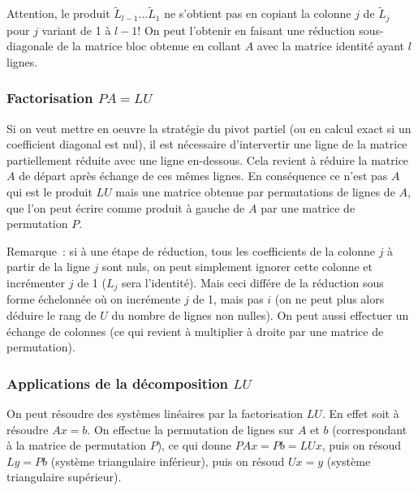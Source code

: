 \documentclass[a4paper,11pt]{article}
\begin{document}
Attention, le produit $\tilde{L}_{l-1}...\tilde{L}_1$ ne s'obtient pas en
copiant la colonne $j$ de $\tilde{L}_j$ pour $j$ variant de 1 \`a
$l-1$! On peut l'obtenir en faisant
une r\'eduction sous-diagonale de la matrice bloc obtenue en collant
$A$ avec la matrice identit\'e ayant $l$ lignes.

\subsubsection{Factorisation $PA=LU$}
Si on veut mettre en oeuvre la strat\'egie du pivot partiel (ou en
calcul exact si un coefficient diagonal est nul), il est n\'ecessaire
d'intervertir une ligne de la matrice partiellement r\'eduite
avec une ligne en-dessous. Cela revient \`a r\'eduire la matrice
$A$ de d\'epart apr\`es \'echange de ces m\^emes lignes. En
cons\'equence ce n'est pas $A$ qui est le produit $LU$ mais
une matrice obtenue par permutations de lignes de $A$, que
l'on peut \'ecrire comme produit \`a gauche de $A$ par une matrice
de permutation $P$.

Remarque~: si \`a une \'etape de r\'eduction, tous les coefficients
de la colonne $j$ \`a partir de la ligne $j$ sont nuls, on peut
simplement ignorer cette colonne et incr\'ementer $j$ de 1 ($L_j$
sera l'identit\'e).
Mais ceci diff\'ere de la r\'eduction sous forme \'echelonn\'ee
o\`u on incr\'emente $j$ de 1, mais pas $i$ (on ne peut plus
alors d\'eduire le rang de $U$ du nombre de lignes non nulles).
On peut aussi effectuer un \'echange de colonnes (ce qui revient
\`a multiplier \`a droite par une matrice de permutation).

\subsubsection{Applications de la d\'ecomposition $LU$}
On peut r\'esoudre des syst\`emes lin\'eaires par la factorisation
$LU$. En effet soit \`a r\'esoudre $Ax=b$. On effectue la permutation
de lignes sur $A$ et $b$ (correspondant \`a la matrice de permutation
$P$), ce qui donne $PAx=Pb=LUx$, puis on r\'esoud $Ly=Pb$
(syst\`eme triangulaire inf\'erieur), puis on r\'esoud $Ux=y$
(syst\`eme triangulaire sup\'erieur).
\end{document}
